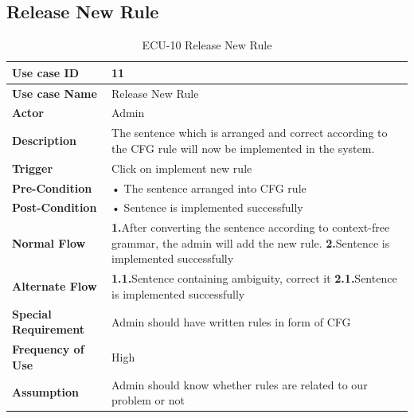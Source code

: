 \documentclass[12pt,a4paper]{article}
\begin{document}
      \subsection{Release New Rule}
    \begin{table}[h!]
\caption{ECU-10 Release New Rule}
    \centering
    \begin{tabular}{|l|p{10cm}|}
    \hline
       \textbf{Use case ID}&11 \\ %
       \hline
       \textbf{Use case Name}&Release New Rule\\ %
       \hline
       \textbf{Actor}&Admin \\ %
       \hline
       \textbf{Description}&The sentence which is arranged and correct according to the CFG rule will now be implemented in the system.\\ %
       \hline
       \textbf{Trigger}&Click on implement new rule \\ %
        \hline
       \textbf{Pre-Condition}&
• The sentence arranged into CFG rule\\ %
        \hline
       \textbf{Post-Condition}&• Sentence is implemented successfully
 \\ %
        \hline
       \textbf{Normal Flow}&
    \textbf{1.}After converting the sentence according to context-free grammar, the admin will add the new rule.
\newline\textbf{2.}Sentence is implemented successfully\\ %
\hline
       \textbf{Alternate Flow}&
       \textbf{1.1.}Sentence containing ambiguity, correct it
\newline\textbf{2.1.}Sentence is implemented successfully\\ %
        \hline
       \textbf{Special Requirement}&Admin should have written rules in form of CFG \\ %
        \hline
       \textbf{Frequency of Use}&High \\ %
        \hline
       \textbf{Assumption}&Admin should know whether rules are related to our problem or not\\ %
       \hline
    \end{tabular} 
    \end{table}




\newpage
\end{document}
